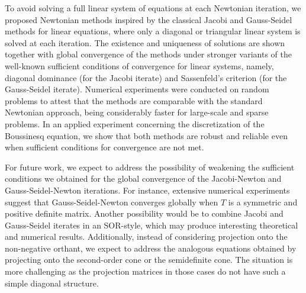 \documentclass[11pt]{article}
\begin{document}
To avoid solving a full linear system of equations at each Newtonian iteration, we proposed Newtonian methods inspired by the classical Jacobi and Gauss-Seidel methods for linear equations, where only a diagonal or triangular linear system is solved at each iteration. The existence and uniqueness of solutions are shown together with global convergence of the methods under stronger variants of the well-known sufficient conditions of convergence for linear systems, namely, diagonal dominance (for the Jacobi iterate) and Sassenfeld's criterion (for the Gauss-Seidel iterate). Numerical experiments were conducted on random problems to attest that the methods are comparable with the standard Newtonian approach, being considerably faster for large-scale and sparse problems. In an applied experiment concerning the discretization of the Boussinesq equation, we show that both methods are robust and reliable even when sufficient conditions for convergence are not met.

For future work, we expect to address the possibility of weakening the sufficient conditions we obtained for the global convergence of the Jacobi-Newton and Gauss-Seidel-Newton iterations. For instance, extensive numerical experiments suggest that Gauss-Seidel-Newton converges globally when $T$ is a symmetric and positive definite matrix. Another possibility would be to combine Jacobi and Gauss-Seidel iterates in an SOR-style, which may produce interesting theoretical and numerical results. Additionally, instead of considering projection onto the non-negative orthant, we expect to address the analogous equations obtained by projecting onto the second-order cone or the semidefinite cone. The situation is more challenging as the projection matrices in those cases do not have such a simple diagonal structure.

\end{document}
